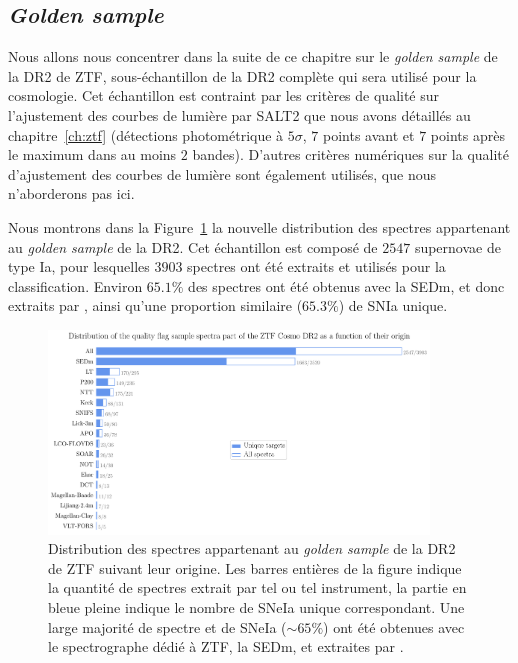 \documentclass[../main/main.tex]{subfiles}
\begin{document}
\subsection{\textit{Golden sample}}

Nous allons nous concentrer dans la suite de ce chapitre sur le \textit{golden
  sample} de la DR2 de ZTF, sous-échantillon de la DR2 complète qui sera
utilisé pour la cosmologie. Cet échantillon est contraint par les
critères de qualité sur l'ajustement des courbes de lumière par SALT2
que nous avons détaillés au chapitre~\ref{ch:ztf} (détections
photométrique à $5\sigma$, $7$ points avant et $7$ points après le
maximum dans au moins $2$ bandes).
D'autres critères numériques sur la qualité d'ajustement des courbes de
lumière sont également
utilisés, que nous n'aborderons pas ici.

Nous montrons dans la Figure~\ref{fig:specorigingoldendr2} la nouvelle
distribution des spectres appartenant au \textit{golden sample} de la
DR2. Cet échantillon est composé de $2547$ supernovae de type Ia, pour lesquelles
$3903$ spectres ont été extraits et utilisés pour la classification.
Environ $65.1\%$ des spectres ont été obtenus avec la SEDm, et donc
extraits par \hypergal, ainsi qu'une proportion similaire ($65.3\%$) de SNIa
unique. 

\begin{figure}[ht]
  \centering
  \includegraphics[width=0.9\textwidth]{../figures/09_dr2/spec_instorigin_golden_dr2.pdf}
  \caption[Distribution des spectres appartenant au \textit{golden sample} de la DR2 de ZTF suivant
  leur origine]{Distribution des spectres appartenant au \textit{golden
      sample} de la DR2 de ZTF
    suivant 
    leur origine. Les barres entières de la figure indique la quantité de
    spectres extrait par tel ou tel instrument, la partie en bleue pleine
    indique le nombre de SNeIa unique correspondant. Une large majorité
    de spectre et de SNeIa ($\sim65\%$) ont été obtenues avec le spectrographe dédié à
    ZTF, la SEDm, et extraites par \hypergal.}
  \label{fig:specorigingoldendr2}
\end{figure}
\end{document}
